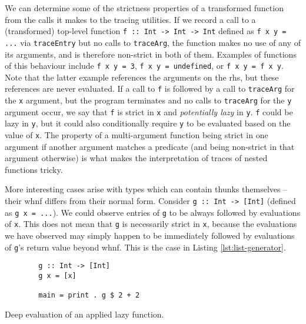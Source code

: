 \documentclass[thesis=B,english]{FITthesis}[2019/12/23]
\newcommand{\hsIdent}[1]{\texttt{#1}}
\newcommand{\hsCode}[1]{\texttt{#1}}
\begin{document}
We can determine some of the strictness properties of a transformed function
from the calls it makes to the tracing utilities. If we record a call to a
(transformed) top-level function \hsCode{f :: Int -> Int -> Int} defined as
\hsCode{f x y = ...} via \hsIdent{traceEntry} but no calls to
\hsIdent{traceArg}, the function makes no use of any of its arguments, and is
therefore non-strict in both of them. Examples of functions of this behaviour
include \hsCode{f x y = 3}, \hsCode{f x y = undefined}, or \hsCode{f x y = f x
y}. Note that the latter example references the arguments on the
\acrshort{rhs}, but these references are never evaluated. If a call to
\hsIdent{f} is followed by a call to \hsIdent{traceArg} for the \hsIdent{x}
argument, but the program terminates and no calls to \hsIdent{traceArg} for the
\hsIdent{y} argument occur, we say that \hsIdent{f} is strict in \hsIdent{x}
and \textit{potentially lazy} in \hsIdent{y}. \hsIdent{f} could be lazy in
\hsIdent{y}, but it could also conditionally require \hsIdent{y} to be
evaluated based on the value of \hsIdent{x}. The property of a multi-argument
function being strict in one argument if another argument matches a predicate
(and being non-strict in that argument otherwise) is what makes the
interpretation of traces of nested functions tricky.

More interesting cases arise with types which can contain thunks themselves --
their \acrlong{whnf} differs from their normal form. Consider \hsCode{g :: Int
-> [Int]} (defined as \hsCode{g x = ...}). We could observe entries of
\hsIdent{g} to be always followed by evaluations of \hsIdent{x}. This does not
mean that \hsIdent{g} is necessarily strict in \hsIdent{x}, because the
evaluations we have observed may simply happen to be immediately followed by
evaluations of \hsIdent{g}'s return value beyond \acrshort{whnf}. This is the
case in Listing \ref{lst:list-generator}.

\begin{listing}[h]
	\centering
	\begin{verbatim}
		g :: Int -> [Int]
		g x = [x]

		main = print . g $ 2 + 2
	\end{verbatim}
	\caption{Deep evaluation of an applied lazy function.}
	\label{lst:list-generator}
\end{listing}
\end{document}
